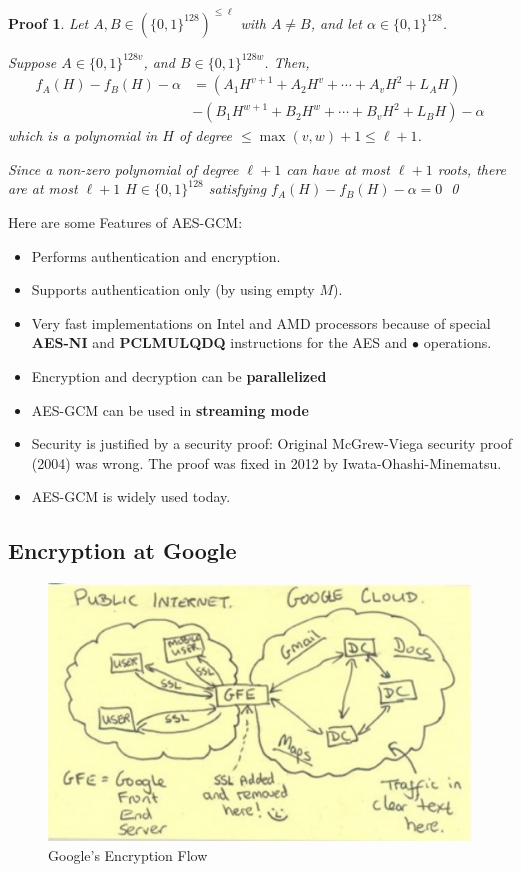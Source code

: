 \documentclass[12pt,titlepage]{article}
\newtheorem{protoproof}[prototheorem]{Proof}
\renewenvironment{proof}
{\colorlet{shadecolor}{blue!15}\begin{shaded}\begin{protoproof}\normalfont}{\qed\end{protoproof}\end{shaded}}
\begin{document}
\begin{proof}
	Let $A, B \in (\{0,1\}^{128})^{\leq \ell}$ with $A \neq B$, and let $\alpha \in \{0,1\}^{128}$. 

	Suppose $A \in \{0,1\}^{128v}$, and $B \in \{0,1\}^{128w}$. Then, \begin{align*}
		f_A(H) - f_B(H) - \alpha &= (A_1H^{v+1} + A_2H^v + \cdots + A_vH^2 + L_AH)\\
		&-(B_1H^{w+1} + B_2H^w + \cdots + B_vH^2 + L_BH) - \alpha
	\end{align*}
	which is a polynomial in $H$ of degree $\leq \max(v,w) +1 \leq \ell + 1$.

	Since a non-zero polynomial of degree $\ell+1$ can have at most $\ell +1$ roots, there are at most $\ell + 1$ $H \in \{0,1\}^{128}$ satisfying $f_A(H) - f_B(H) - \alpha = 0$
\end{proof}

Here are some Features of AES-GCM: \begin{itemize}
	\item Performs authentication and encryption.
	\item Supports authentication only (by using empty $M$).
	\item Very fast implementations on Intel and AMD processors because of special \textbf{AES-NI} and \textbf{PCLMULQDQ} instructions for the AES and $\bullet$ operations.
	\item Encryption and decryption can be \textbf{parallelized}
	\item AES-GCM can be used in \textbf{streaming mode}
	\item Security is justified by a security proof: Original McGrew-Viega security proof (2004) was wrong. The proof was fixed in 2012 by Iwata-Ohashi-Minematsu.
	\item AES-GCM is widely used today.
\end{itemize}

\subsection{Encryption at Google}

\begin{center}
	\begin{figure}[h!]
		\centering
		\includegraphics[width=\textwidth]{Google's_Encryption.png}
		\caption{Google's Encryption Flow}
	\end{figure}
\end{center}
\end{document}
